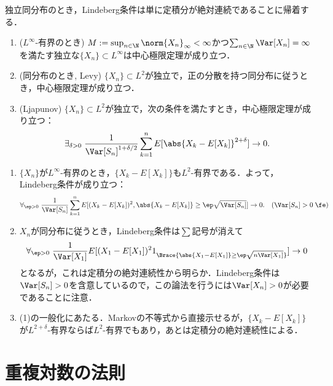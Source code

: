 \documentclass[uplatex,dvipdfmx]{jsreport}
\begin{document}
\begin{tcolorbox}[colframe=ForestGreen, colback=ForestGreen!10!white,breakable,colbacktitle=ForestGreen!40!white,coltitle=black,fonttitle=\bfseries\sffamily,
title=]
    独立同分布のとき，Lindeberg条件は単に定積分が絶対連続であることに帰着する．
\end{tcolorbox}

\begin{proposition}\mbox{}
    \begin{enumerate}
        \item ($L^\infty$-有界のとき) $M:=\sup_{n\in\N}\norm{X_n}_\infty<\infty$かつ$\sum_{n\in\N}\Var[X_n]=\infty$を満たす独立な$\{X_n\}\subset L^\infty$は中心極限定理が成り立つ．
        \item (同分布のとき, Levy) $\{X_n\}\subset L^2$が独立で，正の分散を持つ同分布に従うとき，中心極限定理が成り立つ．
        \item (Ljapunov) $\{X_n\}\subset L^2$が独立で，次の条件を満たすとき，中心極限定理が成り立つ：
        \[\exists_{\delta>0}\;\frac{1}{\Var[S_n]^{1+\delta/2}}\sum^n_{k=1}E[\abs{X_k-E[X_k]}^{2+\delta}]\to0.\]
    \end{enumerate}
\end{proposition}
\begin{Proof}\mbox{}
    \begin{enumerate}
        \item $\{X_n\}$が$L^\infty$-有界のとき，$\{X_k-E[X_k]\}$も$L^2$-有界である．よって，Lindeberg条件が成り立つ：
        \[\forall_{\ep>0}\;\frac{1}{\Var[S_n]}\sum^n_{k=1}E[(X_k-E[X_k])^2,\abs{X_k-E[X_k]}\ge\ep\sqrt{\Var[S_n]}]\to0.\quad(\Var[S_n]>0\;\fe)\]
        \item $X_n$が同分布に従うとき，Lindeberg条件は$\sum$記号が消えて
        \[\forall_{\ep>0}\;\frac{1}{\Var[X_1]}E[(X_1-E[X_1])^21_{\Brace{\abs{X_1-E[X_1]}\ge\ep\sqrt{n\Var[X_1]}}}]\to0\]
        となるが，これは定積分の絶対連続性から明らか．Lindeberg条件は$\Var[S_n]>0$を含意しているので，この論法を行うには$\Var[X_n]>0$が必要であることに注意．
        \item (1)の一般化にあたる．Markovの不等式から直接示せるが，$\{X_k-E[X_k]\}$が$L^{2+\delta}$-有界ならば$L^2$-有界でもあり，あとは定積分の絶対連続性による．
    \end{enumerate}
\end{Proof}

\section{重複対数の法則}
\end{document}
